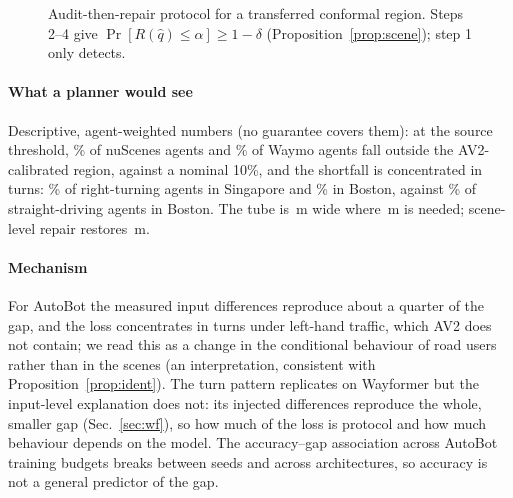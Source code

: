 \begin{figure}[t]
\centering
{}
\caption{Audit-then-repair protocol for a transferred conformal region. Steps 2--4 give $\Pr[R(\hat q)\le\alpha]\ge1-\delta$
(Proposition~\ref{prop:scene}); step 1 only detects.}
\label{fig:protocol}
\end{figure}

\paragraph{What a planner would see} Descriptive, agent-weighted numbers (no guarantee covers them): at the source
threshold, \missAgentsAvNs\% of nuScenes agents and \missAgentsAvWm\% of Waymo agents fall outside the AV2-calibrated
region, against a nominal 10\%, and the shortfall is concentrated in turns: \missRightSg\% of right-turning agents in
Singapore and \missRightBos\% in Boston, against \missStraightBos\% of straight-driving agents in Boston. The tube is
\qSrcAvNs\,m wide where \qOracleAvNs\,m is needed; scene-level repair restores \recQAvNs\,m.

\paragraph{Mechanism} For AutoBot the measured input differences reproduce about a quarter of the gap, and the loss concentrates in
turns under left-hand traffic, which AV2 does not contain; we read this as a change in the conditional behaviour of road
users rather than in the scenes (an interpretation, consistent with Proposition~\ref{prop:ident}). The turn pattern replicates
on Wayformer but the input-level explanation does not: its injected differences reproduce the whole, smaller gap
(Sec.~\ref{sec:wf}), so how much of the loss is protocol and how much behaviour depends on the model. The accuracy--gap
association across AutoBot training budgets breaks between seeds and across architectures, so accuracy is not a general
predictor of the gap.

